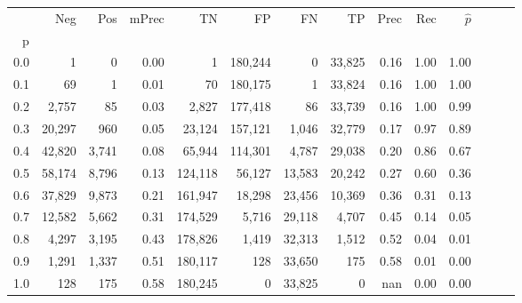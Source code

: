 \begin{tabular}{rrrrrrrrrrrrrr}
\toprule
{} &     Neg &    Pos & mPrec &       TN &       FP &      FN &      TP &  Prec &   Rec & $\hat{p}$ \\
p   &         &        &       &          &          &         &         &       &       &           \\
\midrule
0.0 &       1 &      0 &  0.00 &        1 &  180,244 &       0 &  33,825 &  0.16 &  1.00 &      1.00 \\
0.1 &      69 &      1 &  0.01 &       70 &  180,175 &       1 &  33,824 &  0.16 &  1.00 &      1.00 \\
0.2 &   2,757 &     85 &  0.03 &    2,827 &  177,418 &      86 &  33,739 &  0.16 &  1.00 &      0.99 \\
0.3 &  20,297 &    960 &  0.05 &   23,124 &  157,121 &   1,046 &  32,779 &  0.17 &  0.97 &      0.89 \\
0.4 &  42,820 &  3,741 &  0.08 &   65,944 &  114,301 &   4,787 &  29,038 &  0.20 &  0.86 &      0.67 \\
0.5 &  58,174 &  8,796 &  0.13 &  124,118 &   56,127 &  13,583 &  20,242 &  0.27 &  0.60 &      0.36 \\
0.6 &  37,829 &  9,873 &  0.21 &  161,947 &   18,298 &  23,456 &  10,369 &  0.36 &  0.31 &      0.13 \\
0.7 &  12,582 &  5,662 &  0.31 &  174,529 &    5,716 &  29,118 &   4,707 &  0.45 &  0.14 &      0.05 \\
0.8 &   4,297 &  3,195 &  0.43 &  178,826 &    1,419 &  32,313 &   1,512 &  0.52 &  0.04 &      0.01 \\
0.9 &   1,291 &  1,337 &  0.51 &  180,117 &      128 &  33,650 &     175 &  0.58 &  0.01 &      0.00 \\
1.0 &     128 &    175 &  0.58 &  180,245 &        0 &  33,825 &       0 &   nan &  0.00 &      0.00 \\
\bottomrule
\end{tabular}
